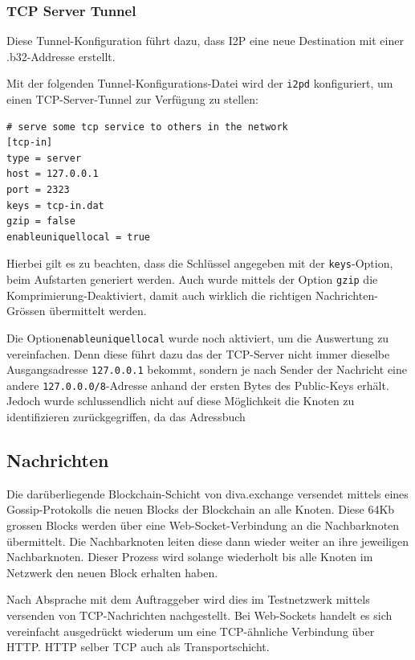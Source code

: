 \subsubsection{TCP Server Tunnel}

Diese Tunnel-Konfiguration führt dazu, dass I2P eine neue Destination mit einer .b32-Addresse erstellt.

Mit der folgenden Tunnel-Konfigurations-Datei wird der \lstinline|i2pd| konfiguriert, um einen TCP-Server-Tunnel zur Verfügung zu stellen:
\begin{lstlisting}
# serve some tcp service to others in the network
[tcp-in]
type = server
host = 127.0.0.1
port = 2323
keys = tcp-in.dat
gzip = false
enableuniquellocal = true
\end{lstlisting}

Hierbei gilt es zu beachten, dass die Schlüssel angegeben mit der \lstinline|keys|-Option, beim Aufstarten generiert werden.
Auch wurde mittels der Option \lstinline|gzip| die Komprimierung-Deaktiviert, damit auch wirklich die richtigen Nachrichten-Grössen übermittelt werden.

Die Option\lstinline|enableuniquellocal| wurde noch aktiviert, um die Auswertung zu vereinfachen. Denn diese führt dazu das der TCP-Server nicht immer dieselbe Ausgangsadresse \lstinline|127.0.0.1| bekommt, sondern je nach Sender der Nachricht eine andere \lstinline|127.0.0.0/8|-Adresse anhand der ersten Bytes des Public-Keys erhält. Jedoch wurde schlussendlich nicht auf diese Möglichkeit die Knoten zu identifizieren zurückgegriffen, da das Adressbuch 


\subsection{Nachrichten}

Die darüberliegende Blockchain-Schicht von diva.exchange versendet mittels eines Gossip-Protokolls die neuen Blocks der Blockchain an alle Knoten.
Diese 64Kb grossen Blocks werden über eine Web-Socket-Verbindung an die Nachbarknoten übermittelt.
Die Nachbarknoten leiten diese dann wieder weiter an ihre jeweiligen Nachbarknoten.
Dieser Prozess wird solange wiederholt bis alle Knoten im Netzwerk den neuen Block erhalten haben.

Nach Absprache mit dem Auftraggeber wird dies im Testnetzwerk mittels versenden von TCP-Nachrichten nachgestellt.
Bei Web-Sockets handelt es sich vereinfacht ausgedrückt wiederum um eine TCP-ähnliche Verbindung über HTTP. HTTP selber TCP auch als Transportschicht.


